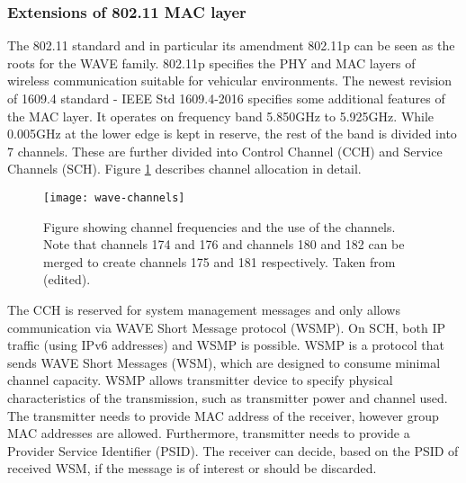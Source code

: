 \subsubsection*{Extensions of 802.11 MAC layer} 
The 802.11 standard and in particular its amendment 802.11p can be seen as the roots for the WAVE family. 802.11p specifies the PHY and MAC layers of wireless communication suitable for vehicular environments. The newest revision of 1609.4 standard - IEEE Std 1609.4-2016 specifies some additional features of the MAC layer. It operates on frequency band 5.850GHz to 5.925GHz. While 0.005GHz at the lower edge is kept in reserve, the rest of the band is divided into 7 channels. These are further divided into Control Channel (CCH) and Service Channels (SCH). Figure \ref{fig:wave-channels} describes channel allocation in detail.\par
% 
\begin{figure}[ht]
    \centering
    \texttt{[image: wave-channels]}
    \caption{Figure showing channel frequencies and the use of the channels. Note that channels 174 and 176 and channels 180 and 182 can be merged to create channels 175 and 181 respectively. Taken from \cite[p. 20]{VehicularTechnologySociety2014IEEEArchitecture} (edited).}
    \label{fig:wave-channels}
\end{figure}
% 
The CCH is reserved for system management messages and only allows communication via WAVE Short Message protocol (WSMP). On SCH, both IP traffic (using IPv6 addresses) and WSMP is possible. WSMP is a protocol that sends WAVE Short Messages (WSM), which are designed to consume minimal channel capacity. WSMP allows transmitter device to specify physical characteristics of the transmission, such as transmitter power and channel used. The transmitter needs to provide MAC address of the receiver, however group MAC addresses are allowed. Furthermore, transmitter needs to provide a Provider Service Identifier (PSID)\footnotemark. The receiver can decide, based on the PSID of received WSM, if the message is of interest or should be discarded.
% 
